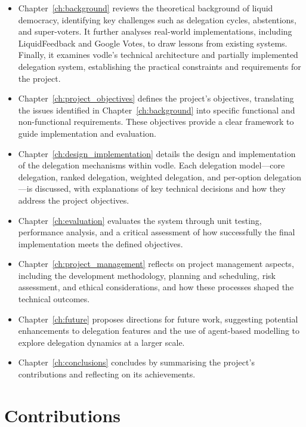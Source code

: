 \begin{itemize}
    \item Chapter~\ref{ch:background} reviews the theoretical background of liquid democracy, identifying key challenges such as delegation cycles, abstentions, and super-voters. It further analyses real-world implementations, including LiquidFeedback and Google Votes, to draw lessons from existing systems. Finally, it examines vodle's technical architecture and partially implemented delegation system, establishing the practical constraints and requirements for the project.

    \item Chapter~\ref{ch:project_objectives} defines the project's objectives, translating the issues identified in Chapter~\ref{ch:background} into specific functional and non-functional requirements. These objectives provide a clear framework to guide implementation and evaluation.

    \item Chapter~\ref{ch:design_implementation} details the design and implementation of the delegation mechanisms within vodle. Each delegation model---core delegation, ranked delegation, weighted delegation, and per-option delegation---is discussed, with explanations of key technical decisions and how they address the project objectives.

    \item Chapter~\ref{ch:evaluation} evaluates the system through unit testing, performance analysis, and a critical assessment of how successfully the final implementation meets the defined objectives.

    \item Chapter~\ref{ch:project_management} reflects on project management aspects, including the development methodology, planning and scheduling, risk assessment, and ethical considerations, and how these processes shaped the technical outcomes.

    \item Chapter~\ref{ch:future} proposes directions for future work, suggesting potential enhancements to delegation features and the use of agent-based modelling to explore delegation dynamics at a larger scale.

    \item Chapter~\ref{ch:conclusions} concludes by summarising the project's contributions and reflecting on its achievements.
\end{itemize}

\section{Contributions}

